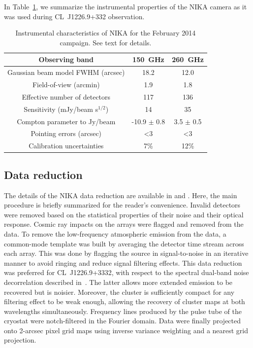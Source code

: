 \documentclass[twocolumn,traditabstract]{aa}
\begin{document}
In Table~\ref{tab:instru}, we summarize the instrumental properties of the NIKA camera as it was used during \mbox{CL~J1226.9+332} observation.
\begin{table}
\caption{Instrumental characteristics of NIKA for the February 2014 campaign. See text for details.}
\begin{center}
\begin{tabular}{ccc}
\hline
\hline
Observing band & 150~GHz & 260~GHz \\
\hline
Gaussian beam model FWHM (arcsec) & 18.2 & 12.0 \\
Field-of-view (arcmin) & 1.9 & 1.8 \\
Effective number of detectors & 117 & 136 \\
Sensitivity (mJy/beam s$^{1/2}$)& 14 & 35 \\
Compton parameter to Jy/beam & -10.9 $\pm$ 0.8 & 3.5 $\pm$ 0.5 \\
Pointing errors (arcsec) & \textless 3 & \textless 3 \\
Calibration uncertainties & 7\% & 12\% \\
\hline
\end{tabular}
\end{center}
\label{tab:instru}
\end{table}

\subsection{Data reduction}\label{sec:data_reduction}
The details of the NIKA data reduction are available in \cite{adam2013} and \cite{catalano2014}. Here, the main procedure is briefly summarized for the reader's convenience. Invalid detectors were removed based on the statistical properties of their noise and their optical response. Cosmic ray impacts on the arrays were flagged and removed from the data. To remove the low-frequency atmospheric emission from the data, a common-mode template was built by averaging the detector time stream across each array. This was done by flagging the source in signal-to-noise in an iterative manner to avoid ringing and reduce signal filtering effects. This data reduction was preferred for \mbox{CL~J1226.9+3332}, with respect to the spectral dual-band noise decorrelation described in~\cite{adam2013}. The latter allows more extended emission to be recovered but is noisier. Moreover, the cluster is sufficiently compact for any filtering effect to be weak enough, allowing the recovery of cluster maps at both wavelengths simultaneously. Frequency lines produced by the pulse tube of the cryostat were notch-filtered in the Fourier domain. Data were finally projected onto 2-arcsec pixel grid maps using inverse variance weighting and a nearest grid projection.
\end{document}
